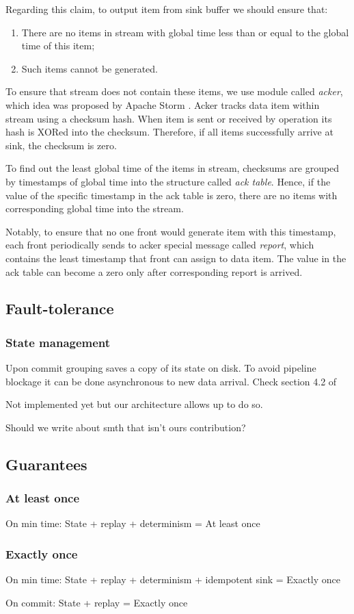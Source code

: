 Regarding this claim, to output item from sink buffer we should ensure that:
\begin{enumerate}
    \item There are no items in stream with global time less than or equal to the global time of this item;
    \item Such items cannot be generated.
\end{enumerate}

To ensure that stream does not contain these items, we use module called {\it acker}, which idea was proposed by Apache Storm \cite{apache:storm}. Acker tracks data item within stream using a checksum hash. When item is sent or received by operation its hash is XORed into the checksum. Therefore, if all items successfully arrive at sink, the checksum is zero. 

To find out the least global time of the items in stream, checksums are grouped by timestamps of global time into the structure called {\it ack table}. Hence, if the value of the specific timestamp in the ack table is zero, there are no items with corresponding global time into the stream. 

Notably, to ensure that no one front would generate item with this timestamp, each front periodically sends to acker special message called {\it report}, which contains the least timestamp that front can assign to data item. The value in the ack table can become a zero only after corresponding report is arrived.  

\subsection{Fault-tolerance}

\subsubsection{State management}
Upon commit grouping saves a copy of its state on disk. To avoid pipeline blockage it can be done asynchronous to new data arrival. Check section 4.2 of \cite{Carbone:2017:SMA:3137765.3137777}

Not implemented yet but our architecture allows up to do so. 

Should we write about smth that isn't ours contribution?

\subsection{Guarantees}

\subsubsection{At least once}
On min time: State + replay + determinism = At least once

\subsubsection{Exactly once}
On min time: State + replay + determinism + idempotent sink = Exactly once

On commit: State + replay = Exactly once



